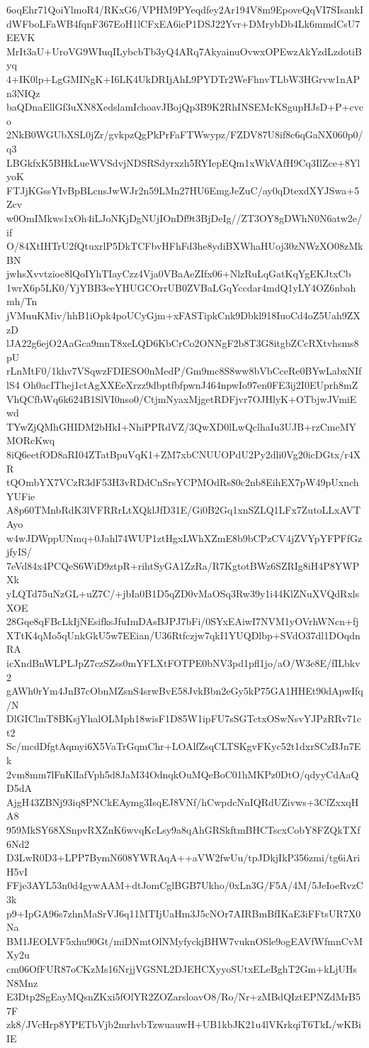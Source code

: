 6oqEhr71QoiYlmoR4/RKxG6/VPHM9PYeqdfey2Ar194V8m9EpoveQqVI7SIsankI
dWFboLFaWB4fqnF367EoH1lCFxEA6icP1DSJ22Yvr+DMrybDb4Lk6mmdCsU7EEVK
MrIt3aU+UroVG9WIuqILybcbTb3yQ4ARq7AkyainuOvwxOPEwzAkYzdLzdotiByq
4+IK0lp+LgGMINgK+I6LK4UkDRIjAhL9PYDTr2WeFhnvTLbW3HGrvw1nAPn3NIQz
baQDnaEllGf3uXN8XedslamIchoavJBojQp3B9K2RhINSEMcKSgupHJsD+P+cvco
2NkB0WGUbXSL0jZr/gvkpzQgPkPrFaFTWwypz/FZDV87U8if8c6qGaNX060p0/q3
LBGkfxK5BHkLueWVSdvjNDSRSdyrxzh5RYIepEQm1xWkVAfH9Cq3IlZce+8YlyoK
FTJjKGssYIvBpBLcnsJwWJr2n59LMn27HU6EmgJeZuC/ay0qDtexdXYJSwa+5Zcv
w0OmIMkws1xOh4iLJoNKjDgNUjIOnDf9t3BjDeIg//ZT3OY8gDWhN0N6atw2e/if
O/84XtIHTrU2fQtuxrlP5DkTCFbvHFhFd3he8ydiBXWhaHUoj30zNWzXO08zMkBN
jwhsXvvtzioe8lQoIYhTIayCzz4Vja0VBaAeZIfx06+NlzRuLqGatKqYgEKJtxCb
1wrX6p5LK0/YjYBB3eeYHUGCOrrUB0ZVBaLGqYccdar4mdQ1yLY4OZ6nbahmh/Tn
jVMuuKMiv/hhB1iOpk4poUCyGjm+xFASTipkCnk9Dbkl918IuoCd4oZ5Uah9ZXzD
lJA22g6ejO2AaGca9mnT8xeLQD6KbCrCo2ONNgF2b8T3G8itgbZCcRXtvhsms8pU
rLnMtF0/1khv7VSqwzFDIESO0nMedP/Gm9mc8S8ww8bVbCceRe0BYwLabxNIflS4
Oh0acIThej1ctAgXXEeXrzz9dbptfbfpwnJ464npwIo97en0FE3ij2I0EUprh8mZ
VhQCfbWq6k624B1SlVI0nso0/CtjmNyaxMjgetRDFjvr7OJHlyK+OTbjwJVmiEwd
TYwZjQMhGHIDM2bHkI+NhiPPRdVZ/3QwXD0lLwQclhaIu3UJB+rzCmeMYMORcKwq
8iQ6eetfOD8aRI04ZTatBpuVqK1+ZM7xbCNUUOPdU2Py2dli0Vg20icDGtx/r4XR
tQOmbYX7VCzR3dF53H3vRDdCnSrsYCPMOdRs80c2nb8EihEX7pW49pUxnchYUFie
A8p60TMnbRdK3lVFRRrLtXQklJfD31E/Gi0B2Gq1xnSZLQ1LFx7ZutoLLxAVTAyo
w4wJDWppUNmq+0Jahl74WUP1ztHgxLWhXZmE8b9bCPzCV4jZVYpYFPFfGzjfyIS/
7eVd84x4PCQeS6WiD9ztpR+rihtSyGA1ZzRa/R7KgtotBWz6SZRIg8iH4P8YWPXk
yLQTd75uNzGL+uZ7C/+jbIa0B1D5qZD0vMaOSq3Rw39y1i44KlZNuXVQdRxlsXOE
28Gqe8qFBcLkIjNEsifksJfuImDAsBJPJ7bFi/0SYxEAiwI7NVM1yOVrhWNcn+fj
XTtK4qMo5qUnkGkU5w7EEian/U36Rtfczjw7qkI1YUQDlbp+SVdO37dl1DOqdnRA
icXndBnWLPLJpZ7czSZss0mYFLXtFOTPE0bNV3pd1pfl1jo/aO/W3e8E/fILbkv2
gAWh0rYm4JnB7cObnMZsnS4srwBvE58JvkBbn2eGy5kP75GA1HHEt90dApwIfq/N
DlGIClmT8BKsjYhalOLMph18wisF1D85W1ipFU7sSGTctxOSwNsvYJPzRRv71ct2
Sc/mcdDfgtAqmyi6X5VaTrGqmChr+LOAlfZsqCLTSKgvFKyc52t1dxrSCzBJn7Ek
2vm8mm7lFnKlIafVph5d8JaM34OdnqkOuMQeBoC01hMKPz0DtO/qdyyCdAaQD5dA
AjgH43ZBNj93iq8PNCkEAymg3IsqEJ8VNf/hCwpdcNnIQRdUZivws+3CfZxxqHA8
959MkSY68XSnpvRXZnK6wvqKcLsy9a8qAhGRSkftmBHCTscxCobY8FZQkTXf6Nd2
D3LwR0D3+LPP7BymN608YWRAqA++aVW2fwUu/tpJDkjIkP356zmi/tg6iAriH5vI
FFje3AYL53n0d4gywAAM+dtJomCglBGB7Ukho/0xLn3G/F5A/4M/5JeIoeRvzC3k
p9+IpGA96s7zhnMaSrVJ6q11MTIjUaHm3J5cNOr7AIRBmBfIKaE3iFFtsUR7X0Na
BM1JEOLVF5xhu90Gt/miDNmtOlNMyfyckjBHW7vuknOSle9ogEAVfWfmnCvMXy2u
cm06OfFUR87oCKzMs16NrjjVGSNL2DJEHCXyyoSUtxELeBghT2Gm+kLjUHsN8Mnz
E3Dtp2SgEayMQsnZKxi5fOlYR2ZOZarsloavO8/Ro/Nr+zMBdQIztEPNZdMrB57F
zk8/JVcHrp8YPETbVjb2mrhvbTzwuauwH+UB1kbJK21u4lVKrkqiT6TkL/wKBiIE
